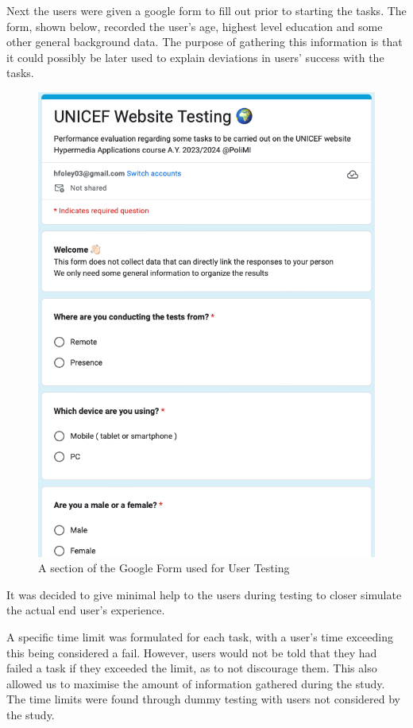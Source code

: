 Next the users were given a google form to fill out prior to starting the tasks. The form, shown below, recorded the user’s age, highest level education and some other general background data. The purpose of gathering this information is that it could possibly be later used to explain deviations in users’ success with the tasks.
\begin{figure}[h]
    \centering
    \includegraphics[scale=0.4]{Resources/Harry/GoogleForm.png}
    \caption{A section of the Google Form used for User Testing}
\end{figure}

It was decided to give minimal help to the users during testing to closer simulate the actual end user's experience.

A specific time limit was formulated for each task, with a user’s time exceeding this being considered a fail. However, users would not be told that they had failed a task if they exceeded the limit, as to not discourage them. This also allowed us to maximise the amount of information gathered during the study. The time limits were found through dummy testing with users not considered by the study. 

